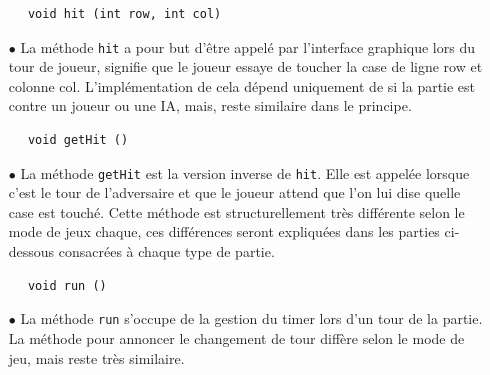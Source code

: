 \documentclass[12pt]{article}
\begin{document}
\begin{verbatim}
      void hit (int row, int col)
\end{verbatim}
\begin{itemize}
      \item[$\bullet$] La méthode \texttt{hit} a pour but d'être appelé par
            l'interface graphique lors du tour de joueur, signifie que le
            joueur essaye de
            toucher la case de ligne row et colonne col. L'implémentation de
            cela dépend
            uniquement de si la partie est contre un joueur ou une IA, mais,
            reste
            similaire dans le principe.
\end{itemize}
\bigskip
\begin{verbatim}
      void getHit ()
\end{verbatim}
\begin{itemize}
      \item[$\bullet$] La méthode \texttt{getHit} est la version inverse de
            \texttt{hit}.
            Elle est appelée lorsque c'est le tour de l'adversaire et que le
            joueur attend
            que l'on lui dise quelle case est touché. Cette méthode est
            structurellement très différente selon le mode de jeux chaque, ces
            différences
            seront expliquées dans les parties ci-dessous consacrées à chaque
            type de partie.
\end{itemize}
\bigskip
\begin{verbatim}
      void run ()
\end{verbatim}
\begin{itemize}
      \item[$\bullet$] La méthode \texttt{run} s'occupe de la gestion du timer
            lors d'un tour de la partie. La méthode pour annoncer le changement
            de tour
            diffère selon le mode de jeu, mais reste très similaire.
\end{itemize}
\end{document}
